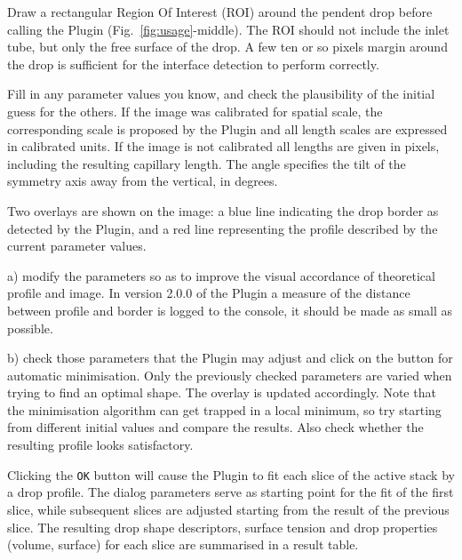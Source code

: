 \documentclass[fleqn]{scrartcl}
\begin{document}
Draw a rectangular Region Of Interest (ROI) around the pendent drop
before calling the Plugin (Fig.~\ref{fig:usage}-middle). The ROI
should not include the inlet tube, but only the free surface of the
drop. A few ten or so pixels margin around the drop is sufficient for
the interface detection to perform correctly.

Fill in any parameter values you know, and check the plausibility of
the initial guess for the others. If the image was calibrated for
spatial scale, the corresponding scale is proposed by the Plugin and
all length scales are expressed in calibrated units. If the image is
not calibrated all lengths are given in pixels, including the
resulting capillary length. The angle specifies the tilt of the
symmetry axis away from the vertical, in degrees. 

Two overlays are shown on the image: a blue line indicating the drop
border as detected by the Plugin, and a red line representing the
profile described by the current parameter values.

a) modify the parameters so as to improve the visual accordance of
theoretical profile and image. In version 2.0.0 of the Plugin a
measure of the distance between profile and border is logged to the
console, it should be made as small as possible.

b) check those parameters that the Plugin may adjust and click on the
button for automatic minimisation. Only the previously checked
parameters are varied when trying to find an optimal shape. The
overlay is updated accordingly. Note that the minimisation algorithm
can get trapped in a local minimum, so try starting from different
initial values and compare the results. Also check whether the
resulting profile looks satisfactory.

Clicking the \texttt{OK} button will cause the Plugin to fit each
slice of the active stack by a drop profile. The dialog parameters
serve as starting point for the fit of the first slice, while
subsequent slices are adjusted starting from the result of the
previous slice. The resulting drop shape descriptors, surface tension
and drop properties (volume, surface) for each slice are summarised in
a result table.
\end{document}
